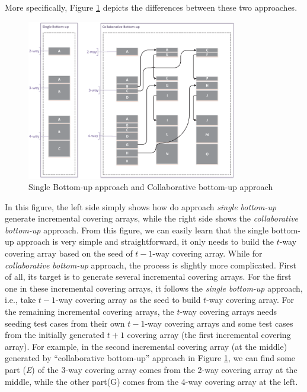 \documentclass[conference]{IEEEtran}
\theoremstyle{definition}
\begin{document}
More specifically, Figure \ref{comparebottomupwithcollaborative} depicts the differences between these two approaches.
\begin{figure}
 \includegraphics[width=3.6in]{differentIncremental.eps}
\caption{Single Bottom-up approach and Collaborative bottom-up approach}
\label{comparebottomupwithcollaborative}
\end{figure}
In this figure, the left side simply shows how do approach \emph{single bottom-up} generate incremental covering arrays, while the right side shows the \emph{collaborative bottom-up} approach.  From this figure, we can easily learn that the single bottom-up approach is very simple and straightforward, it only needs to build the $t$-way covering array based on the seed of $t-1$-way covering array. While for \emph{collaborative bottom-up} approach, the process is slightly more complicated. First of all, its target is to generate several incremental covering arrays. For the first one in these incremental covering arrays, it follows the \emph{single bottom-up} approach, i.e., take $t-1$-way covering array as the seed to build $t$-way covering array. For the remaining incremental covering arrays, the $t$-way covering arrays needs seeding test cases from their own $t-1$-way covering arrays and some test cases from the initially generated $t+1$ covering array (the first incremental covering array). For example, in the second incremental covering array (at the middle) generated by ``collaborative bottom-up'' approach in Figure \ref{comparebottomupwithcollaborative}, we can find some part (\emph{E}) of the 3-way covering array comes from the 2-way covering array at the middle, while the other part(G) comes from the 4-way covering array at the left.
\end{document}
